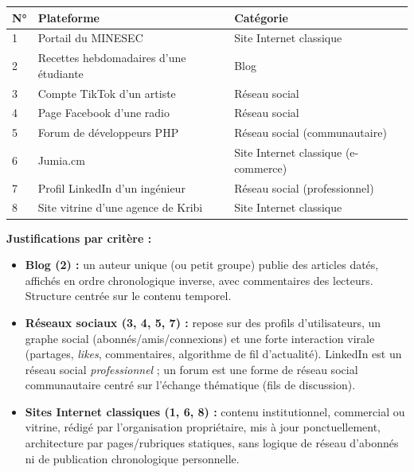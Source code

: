 \documentclass[11pt]{article}
\begin{document}
\begin{corrige}
\begin{center}
\begin{tabularx}{\linewidth}{|l|X|l|}
\hline
\rowcolor{popblueL} \textbf{N°} & \textbf{Plateforme} & \textbf{Catégorie} \\
\hline
1 & Portail du MINESEC & Site Internet classique \\
\hline
2 & Recettes hebdomadaires d'une étudiante & Blog \\
\hline
3 & Compte TikTok d'un artiste & Réseau social \\
\hline
4 & Page Facebook d'une radio & Réseau social \\
\hline
5 & Forum de développeurs PHP & Réseau social (communautaire) \\
\hline
6 & Jumia.cm & Site Internet classique (e-commerce) \\
\hline
7 & Profil LinkedIn d'un ingénieur & Réseau social (professionnel) \\
\hline
8 & Site vitrine d'une agence de Kribi & Site Internet classique \\
\hline
\end{tabularx}
\end{center}
\textbf{Justifications par critère :}
\begin{itemize}
    \item \textbf{Blog (2) :} un auteur unique (ou petit groupe) publie des articles datés, affichés en ordre chronologique inverse, avec commentaires des lecteurs. Structure centrée sur le contenu temporel.
    \item \textbf{Réseaux sociaux (3, 4, 5, 7) :} repose sur des profils d'utilisateurs, un graphe social (abonnés/amis/connexions) et une forte interaction virale (partages, \emph{likes}, commentaires, algorithme de fil d'actualité). LinkedIn est un réseau social \emph{professionnel} ; un forum est une forme de réseau social communautaire centré sur l'échange thématique (fils de discussion).
    \item \textbf{Sites Internet classiques (1, 6, 8) :} contenu institutionnel, commercial ou vitrine, rédigé par l'organisation propriétaire, mis à jour ponctuellement, architecture par pages/rubriques statiques, sans logique de réseau d'abonnés ni de publication chronologique personnelle.
\end{itemize}
\end{corrige}
\end{document}
